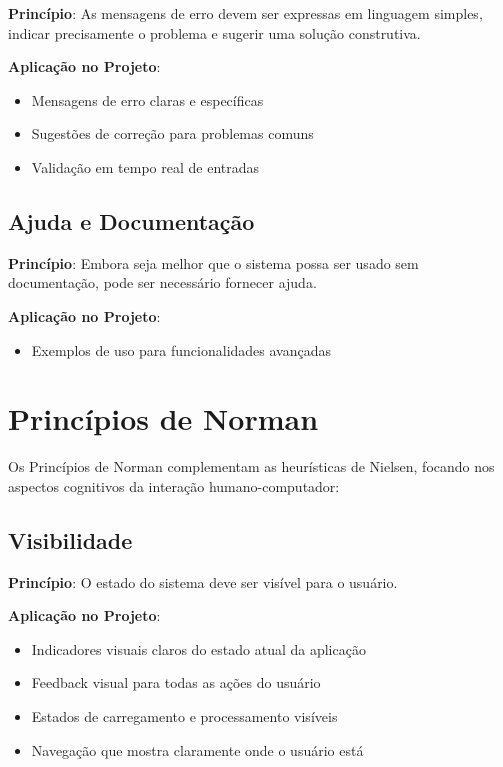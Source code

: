 \textbf{Princípio}: As mensagens de erro devem ser expressas em linguagem simples, indicar precisamente o problema e sugerir uma solução construtiva.

\textbf{Aplicação no Projeto}:
\begin{itemize}
    \item Mensagens de erro claras e específicas
    \item Sugestões de correção para problemas comuns
    \item Validação em tempo real de entradas
\end{itemize}

\subsection{Ajuda e Documentação}

\textbf{Princípio}: Embora seja melhor que o sistema possa ser usado sem documentação, pode ser necessário fornecer ajuda.

\textbf{Aplicação no Projeto}:
\begin{itemize}
    \item Exemplos de uso para funcionalidades avançadas
\end{itemize}

\section{Princípios de Norman}

Os Princípios de Norman complementam as heurísticas de Nielsen, focando nos aspectos cognitivos da interação humano-computador:

\subsection{Visibilidade}

\textbf{Princípio}: O estado do sistema deve ser visível para o usuário.

\textbf{Aplicação no Projeto}:
\begin{itemize}
    \item Indicadores visuais claros do estado atual da aplicação
    \item Feedback visual para todas as ações do usuário
    \item Estados de carregamento e processamento visíveis
    \item Navegação que mostra claramente onde o usuário está
\end{itemize}

